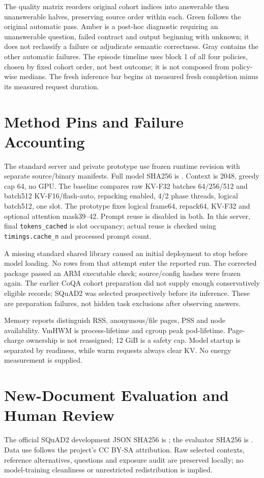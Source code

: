 \documentclass{article}
\begin{document}
The quality matrix reorders original cohort indices into answerable then
unanswerable halves, preserving source order within each. Green follows the
original automatic pass. Amber is a post-hoc diagnostic requiring an
unanswerable question, failed contract and output beginning with unknown;
it does not reclassify a failure or adjudicate semantic correctness. Gray
contains the other automatic failures. The episode timeline uses block 1 of
all four policies, chosen by fixed cohort order, not best outcome; it is not
composed from policy-wise medians. The fresh inference bar begins at measured
fresh completion minus its measured request duration.

\section{Method Pins and Failure Accounting}
The standard server and private prototype use frozen runtime revision
 with separate source/binary manifests.
Full model SHA256 is
.
Context is 2048, greedy cap 64, no GPU. The baseline compares raw KV-F32 batches
64/256/512 and batch512 KV-F16/flash-auto, repacking enabled, 4/2 phase threads,
logical batch512, one slot. The prototype fixes logical frame64, repack64,
KV-F32 and optional attention mask39--42. Prompt reuse is disabled in both.
In this server, final \texttt{tokens\_cached} is slot occupancy; actual reuse is
checked using \texttt{timings.cache\_n} and processed prompt count.

A missing standard shared library caused an initial deployment to stop before
model loading. No rows from that attempt enter the reported run. The corrected
package passed an ARM executable check; source/config hashes were frozen again.
The earlier CoQA cohort preparation did not supply enough conservatively
eligible records; SQuAD2 was selected prospectively before its inference. These
are preparation failures, not hidden task exclusions after observing answers.

Memory reports distinguish RSS, anonymous/file pages, PSS and node availability.
VmHWM is process-lifetime and cgroup peak pod-lifetime. Page-charge ownership is
not reassigned; 12 GiB is a safety cap. Model startup is separated by readiness,
while warm requests always clear KV. No energy measurement is supplied.

\section{New-Document Evaluation and Human Review}
The official SQuAD2 development JSON SHA256 is
;
the evaluator SHA256 is
.
Data use follows the project's CC BY-SA attribution. Raw selected contexts,
reference alternatives, questions and exposure audit are preserved locally;
no model-training cleanliness or unrestricted redistribution is implied.
\end{document}
